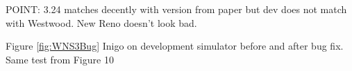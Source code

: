 \begin{figure}[h!]
\begin{center}
\end{center}
\caption{}
\label{fig:WNS3Prod}
\end{figure}

POINT: 3.24 matches decently with version from paper but dev does not match with Westwood. New Reno doesn't look bad. 

\pagebreak

Figure \ref{fig:WNS3Bug} Inigo on development simulator before and after bug fix. Same test from \cite{NS3W} Figure 10


